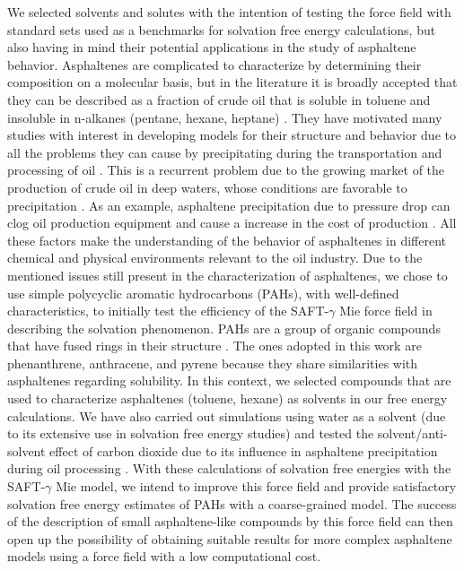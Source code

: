 \documentclass[final,12p,times,twocolumn]{elsarticle}
\begin{document}
	We selected solvents and solutes with the intention of testing the force field with standard sets used as a benchmarks for solvation free energy calculations, but also having in mind their potential applications in the study of asphaltene behavior. Asphaltenes are complicated to characterize by determining their composition on a molecular basis, but in the literature it is broadly accepted that they can be described as a fraction of crude oil that is soluble in toluene and insoluble in n-alkanes (pentane, hexane, heptane) \cite{SJOBLOM2003399}. They have motivated many studies with interest in developing models for their structure and behavior due to all the problems they can cause by precipitating during the transportation and processing of oil \cite{SJOBLOM20151}. This is a recurrent problem due to the growing market of the production of crude oil in deep waters, whose conditions are favorable to precipitation \cite{AIC:AIC10243}. As an example, asphaltene precipitation due to pressure drop can clog oil production equipment and cause a increase in the cost of production \cite{doi:10.1021/ef010047l}. All these factors make the understanding of the behavior of asphaltenes in different chemical and physical environments relevant to the oil industry. Due to the mentioned issues still present in the characterization of asphaltenes, we chose to use simple polycyclic aromatic hydrocarbons (PAHs), with well-defined characteristics, to initially test the efficiency of the SAFT-$\gamma$ Mie force field in describing the solvation phenomenon. PAHs are a group of organic compounds that have fused rings in their structure \cite{RAVINDRA20082895}. The ones adopted in this work are phenanthrene, anthracene, and pyrene because they share similarities with asphaltenes regarding solubility. In this context, we selected compounds that are used to characterize asphaltenes (toluene, hexane) as solvents in our free energy calculations. We have also carried out simulations using water as a solvent (due to its extensive use in solvation free energy studies) and tested the solvent/anti-solvent effect of carbon dioxide due to its influence in asphaltene precipitation during oil processing \cite{SOROUSH2014405}. With these calculations of solvation free energies with the SAFT-$\gamma$ Mie model, we intend to improve this force field and provide satisfactory solvation free energy estimates of PAHs with a coarse-grained model. The success of the description of small asphaltene-like compounds by this force field can then open up the possibility of obtaining suitable results for more complex asphaltene models using a force field with a low computational cost.
\end{document}
